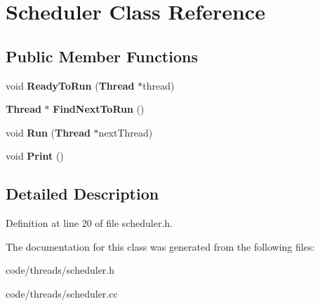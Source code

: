 \section{Scheduler Class Reference}
\label{class_scheduler}
\subsection*{Public Member Functions}
\begin{DoxyCompactItemize}
\item 
void {\bfseries Ready\+To\+Run} ({\bf Thread} $\ast$thread)\label{class_scheduler_a18e89ab130a40c423da77673f12585d7}

\item 
{\bf Thread} $\ast$ {\bfseries Find\+Next\+To\+Run} ()\label{class_scheduler_a0fa7daec8d1058a8e6b5cbfbdd09555e}

\item 
void {\bfseries Run} ({\bf Thread} $\ast$next\+Thread)\label{class_scheduler_a87205b0773d3dd84752ec779c890f5e1}

\item 
void {\bfseries Print} ()\label{class_scheduler_ae82d9a7b506449c5a32d29b81e536076}

\end{DoxyCompactItemize}


\subsection{Detailed Description}


Definition at line 20 of file scheduler.\+h.



The documentation for this class was generated from the following files\+:\begin{DoxyCompactItemize}
\item 
code/threads/scheduler.\+h\item 
code/threads/scheduler.\+cc\end{DoxyCompactItemize}
